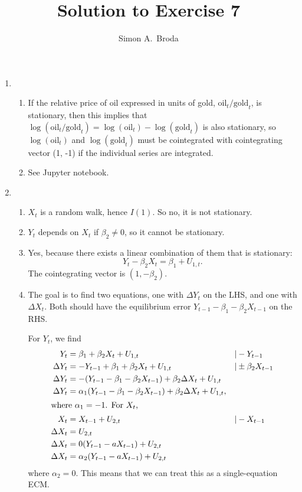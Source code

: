 \documentclass[11pt, a4paper]{article}
\begin{document}
\title{Solution to Exercise 7}
\author{Simon A.\ Broda}
\date{}
\maketitle

\begin{enumerate}


\item
\begin{enumerate}
\item If the relative price of oil expressed in units of gold, $\mbox{oil}_t/\mbox{gold}_t$, is stationary, then this implies that $\log(\mbox{oil}_t/\mbox{gold}_t)=\log (\mbox{oil}_t) - \log(\mbox{gold}_t)$ is also stationary, so $\log(\mbox{oil}_t)$ and $\log(\mbox{gold}_t)$ must be cointegrated with cointegrating vector (1, -1) if the individual series are integrated.
\item See Jupyter notebook.
\end{enumerate}
\item \begin{enumerate}
\item $X_t$ is a random walk, hence $I(1)$. So no, it is not stationary.
\item $Y_t$ depends on $X_t$ if $\beta_2\neq 0$, so it cannot be stationary.
\item Yes, because there exists a linear combination of them that is stationary:
\[
Y_t-\beta_2X_t=\beta_1 +U_{1,t}.
\]
The cointegrating vector is $(1, -\beta_2)$.


\item The goal is to find two equations, one with $\Delta Y_t$ on the LHS, and one with $\Delta X_t.$ Both should have the equilibrium error $Y_{t-1}-\beta_1-\beta_2 X_{t-1}$ on the RHS.

For $Y_t$, we find
\begin{align*}
Y_t&=\beta_1 +\beta_2 X_t+U_{1,t}&|&-Y_{t-1}\\
\Delta Y_t&=-Y_{t-1}+\beta_1+\beta_2X_t+U_{1,t}&|&\pm \beta_2 X_{t-1}\\
\Delta Y_t&=-(Y_{t-1}-\beta_1-\beta_2 X_{t-1})+\beta_2\Delta X_t+U_{1,t}&\\
\Delta Y_t&=\alpha_1(Y_{t-1}-\beta_1-\beta_2X_{t-1})+\beta_2\Delta X_t+U_{1,t},&\\
\intertext{where $\alpha_1=-1$. For $X_t$, }
X_t&=X_{t-1}+U_{2,t}&|&-X_{t-1}\\
\Delta X_t&=U_{2,t}&&\\
\Delta X_t&=0(Y_{t-1}-aX_{t-1})+U_{2,t}\\
\Delta X_t&=\alpha_2(Y_{t-1}-aX_{t-1})+U_{2,t}
\end{align*}
where $\alpha_2=0$. This means that we can treat this as a single-equation ECM.
\end{enumerate}
\end{enumerate}
\end{document}
